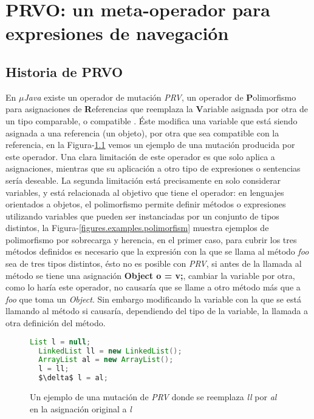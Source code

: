 \chapter[PRVO]{PRVO: un meta-operador para expresiones de navegaci\'on}
\label{cap:prvo}

\section{Historia de PRVO}
\label{sec:prvo.history}
En \emph{$\mu$Java} existe un operador de mutaci\'on \emph{PRV}, un operador de \textbf{P}olimorfismo para asignaciones de \textbf{R}eferencias que reemplaza la \textbf{V}ariable asignada por otra de un tipo comparable, o compatible \cite{muJavaCOPS, bibliography.mutation.operators.MaKO02}. \'Este modifica una variable que est\'a siendo asignada a una referencia (un objeto), por otra que sea compatible con la referencia, en la Figura-\ref{figures.examples.PRV} vemos un ejemplo de una mutaci\'on producida por este operador. Una clara limitaci\'on de este operador es que solo aplica a asignaciones, mientras que su aplicaci\'on a otro tipo de expresiones o sentencias ser\'ia deseable. La segunda limitaci\'on est\'a precisamente en solo considerar variables, y est\'a relacionada al objetivo que tiene el operador: en lenguajes orientados a objetos, el polimorfismo permite definir m\'etodos o expresiones utilizando variables que pueden ser instanciadas por un conjunto de tipos distintos, la Figura-\ref{figures.examples.polimorfism} muestra ejemplos de polimorfismo por sobrecarga y herencia, en el primer caso, para cubrir los tres m\'etodos definidos es necesario que la expresi\'on con la que se llama al m\'etodo \emph{foo} sea de tres tipos distintos, \'esto no es posible con \emph{PRV}, si antes de la llamada al m\'etodo se tiene una asignaci\'on \textbf{Object o = v;}, cambiar la variable por otra, como lo har\'ia este operador, no causar\'ia que se llame a otro m\'etodo m\'as que a \emph{foo} que toma un \emph{Object}. Sin embargo modificando la variable con la que se est\'a llamando al m\'etodo si causar\'ia, dependiendo del tipo de la variable, la llamada a otra definici\'on del m\'etodo. 

\begin{figure}
	\begin{lstlisting}[mathescape=true, language=Java, extendedchars=true]
  List l = null;
  LinkedList ll = new LinkedList();
  ArrayList al = new ArrayList();
  l = ll;
  $\delta$ l = al;
	\end{lstlisting}
	\caption{Un ejemplo de una mutaci\'on de \emph{PRV} donde se reemplaza \emph{ll} por \emph{al} en la asignaci\'on original a \emph{l}}
	\label{figures.examples.PRV}
\end{figure}

